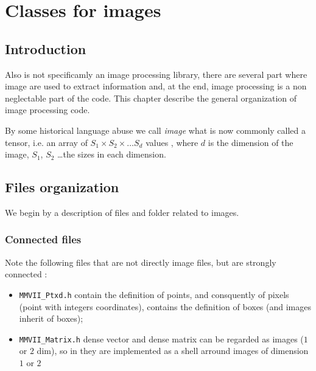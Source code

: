 

\chapter{Classes for images}



\section{Introduction}

Also \PPP is not specificamly an image processing library, there are several part where
image are used to extract information and, at the end, image processing is a non neglectable part
of the code.
This chapter describe the general organization of image processing code.

By some historical language abuse we call \emph{image} what is now commonly called a tensor,
i.e. an array of $S_1 \times S_2 \times \dots S_d$ values , where $d$ is the dimension
of the image, $S_1$, $S_2$ \dots the sizes in each dimension.




\section{Files organization }

We begin by a description of files and folder related to images.


\subsection{Connected files}

Note the following files that are not directly image files, but are strongly connected :

\begin{itemize}
	\item {\tt MMVII\_Ptxd.h} contain the definition of points, and consquently of pixels (point
		with integers coordinates),  contains the definition of boxes (and images inherit
		of boxes);

	\item {\tt MMVII\_Matrix.h} dense vector and dense matrix can be regarded as images ($1$ or $2$ dim), so in \PPP
		they are implemented as a shell arround  images of dimension $1$ or $2$


\end{itemize}

